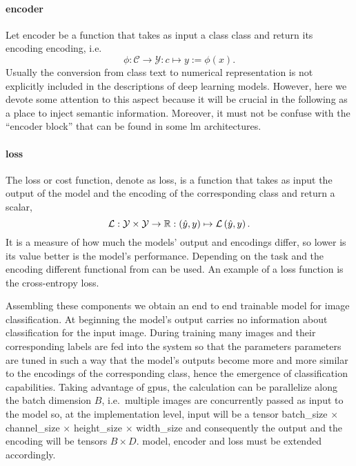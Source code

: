 \paragraph{encoder} Let \gls{encoder} be a function that takes as input a class
\gls{class} and return its encoding \gls{encoding}, i.e.\
\begin{equation}
  \phi: \mathcal{C} \to \mathcal{Y} : c \mapsto y := \phi \left(x\right).
  \label{eq:encoder}
\end{equation}
Usually the conversion from class text to numerical representation is not
explicitly included in the descriptions of deep learning models. However, here
we devote some attention to this aspect because it will be crucial in the
following as a place to inject semantic information. Moreover, it must not be
confuse with the ``encoder block'' that can be found in some \acrshort{lm}
architectures.

\paragraph{loss} The loss or cost function, denote as \gls{loss}, is a function
that takes as input the output of the model and the encoding of the
corresponding class and return a scalar,
\begin{equation}
  \operatorname{\mathcal{L}}: \mathcal{Y} \times \mathcal{Y} \to \mathbb{R}
       : \left(\hat{y}, y\right) \mapsto \operatorname{\mathcal{L}} \left(\hat{y}, y\right).
  \label{eq:loss}
\end{equation}
It is a measure of how much the models' output and encodings differ, so lower is
its value better is the model's performance. Depending on the task and the
encoding different functional from can be used. An example of a loss function is
the cross-entropy loss.

\medskip Assembling these components we obtain an end to end trainable model for
image classification. At beginning the model's output carries no information
about classification for the input image. During training many images and their
corresponding labels are fed into the system so that the parameters
\gls{parameters} are tuned in such a way that the model's outputs become more
and more similar to the encodings of the corresponding class, hence the
emergence of classification capabilities. Taking advantage of \acrshort{gpu}s,
the calculation can be parallelize along the batch dimension $B$, i.e.\ multiple
images are concurrently passed as input to the model so, at the implementation
level, \gls{input} will be a tensor \gls{batch_size} $\times$ \gls{channel_size}
$\times$ \gls{height_size} $\times$ \gls{width_size} and consequently the output
and the encoding will be tensors $B \times D$. \gls{model}, \gls{encoder} and
\gls{loss} must be extended accordingly.


